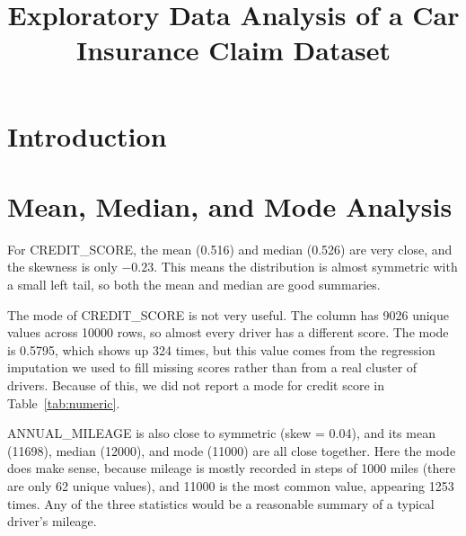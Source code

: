 \documentclass[conference]{IEEEtran}
\begin{document}
\title{Exploratory Data Analysis of a Car Insurance Claim Dataset}

\author{
}

\maketitle

\begin{abstract}
\end{abstract}

\begin{IEEEkeywords}
\end{IEEEkeywords}

\section{Introduction}

\section{Mean, Median, and Mode Analysis}

For CREDIT\_SCORE, the mean (0.516) and median (0.526) are very close, and the skewness is only $-0.23$. This 
means the distribution is almost symmetric with a small left tail, so both the mean and median are good summaries.

The mode of CREDIT\_SCORE is not very useful. The column has \num{9026} unique values across \num{10000} rows, 
so almost every driver has a different score. The mode is 0.5795, which shows up 324 times, but this value comes from the 
regression imputation we used to fill missing scores rather than from a real cluster of drivers. Because of this, we did 
not report a mode for credit score in Table~\ref{tab:numeric}. 
 
ANNUAL\_MILEAGE is also close to symmetric (skew = 0.04), and its mean (\num{11698}), median (\num{12000}), 
and mode (\num{11000}) are all close together. Here the mode does make sense, because mileage is mostly recorded in 
steps of \num{1000} miles (there are only 62 unique values), and \num{11000} is the most common value, appearing \num{1253} 
times. Any of the three statistics would be a reasonable summary of a typical driver's mileage.
\end{document}
